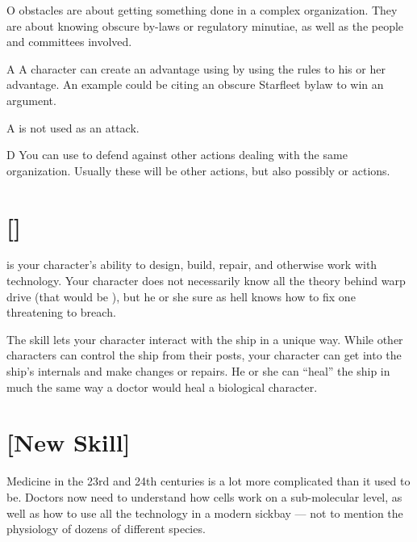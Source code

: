 \documentclass[12pt,titlepage,openany]{book}
\begin{document}
\vspace{1ex}

\begin{NewSkillAction}{O}
     obstacles are about getting something done in a complex
    organization. They are about knowing obscure by-laws or regulatory
    minutiae, as well as the people and committees involved.
\end{NewSkillAction}

\begin{NewSkillAction}{A}
    A character can create an advantage using  by using the
    rules to his or her advantage. An example could be citing an obscure
    Starfleet bylaw to win an argument.
\end{NewSkillAction}

\begin{NewSkillAction}[+]{A}
     is not used as an attack.
\end{NewSkillAction}

\begin{NewSkillAction}{D}
    You can use  to defend against other actions dealing
    with the same organization. Usually these will be other 
    actions, but also possibly  or  actions.
\end{NewSkillAction}

\section{ []}\label{sec:engineering}
 is your character's ability to design, build, repair, and
otherwise work with technology. Your character does not necessarily know all
the theory behind warp drive (that would be ), but he or she
sure as hell knows how to fix one threatening to breach.

The  skill lets your character interact with the ship in a
unique way. While other characters can control the ship from their posts, your
character can get into the ship's internals and make changes or repairs. He or
she can ``heal'' the ship in much the same way a doctor would heal a biological
character.

\section{ [New Skill]}\label{sec:medicine}
Medicine in the 23rd and 24th centuries is a lot more complicated than it used
to be. Doctors now need to understand how cells work on a sub-molecular level,
as well as how to use all the technology in a modern sickbay --- not to mention
the physiology of dozens of different species.
\end{document}
